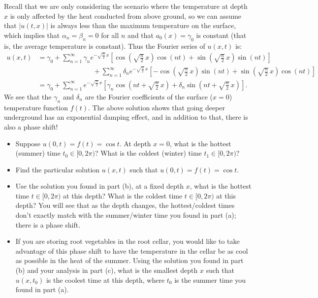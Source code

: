 \documentclass[11pt]{article}
\theoremstyle{definition}
\begin{document}
\begin{enumerate}[leftmargin=*]
Recall that we are only considering the scenario where the temperature at depth $x$ is only affected by the heat conducted from above ground, so we can assume that $|u(t,x)|$ is always less than the maximum temperature on the surface, which implies that $\alpha_{n}=\beta_{n}=0$ for all $n$ and that $a_{0}(x)=\gamma_{0}$ is constant (that is, the average temperature is constant). Thus the Fourier series of $u(x,t)$ is:
\begin{align*}
	u(x,t)
	&=\gamma_{0}+\sum_{n=1}^{\infty}\gamma_{n}e^{-\sqrt{\frac{n}{2}}\,x}\left[\cos(\sqrt{\tfrac{n}{2}}\,x)\cos(nt)+\sin(\sqrt{\tfrac{n}{2}}\,x)\sin(nt)\right]\\
	&\qquad\qquad\qquad\qquad+\sum_{n=1}^{\infty}\delta_{n}e^{-\sqrt{\frac{n}{2}}\,x}\left[-\cos(\sqrt{\tfrac{n}{2}}\,x)\sin(nt)+\sin(\sqrt{\tfrac{n}{2}}\,x)\cos(nt)\right]\\
	&=\gamma_{0}+\sum_{n=1}^{\infty}e^{-\sqrt{\frac{n}{2}}\,x}\left[\gamma_{n}\cos\left(nt+\sqrt{\tfrac{n}{2}}\,x\right)+\delta_{n}\sin\left(nt+\sqrt{\tfrac{n}{2}}\,x\right)\right].
\end{align*}
We see that the $\gamma_{n}$ and $\delta_{n}$ are the Fourier coefficients of the surface ($x=0$) temperature function $f(t)$.  The above solution shows that going deeper underground has an exponential damping effect, and in addition to that, there is also a phase shift!

\begin{itemize}
\item [(a)] Suppose $u(0,t)=f(t)=\cos t$.  At depth $x=0$, what is the hottest (summer) time  $t_0 \in [0,2\pi)$? What is the coldest (winter) time $t_1 \in [0, 2\pi)$?
\item [(b)]  Find the particular solution $u(x,t)$ such that $u(0,t)=f(t)=\cos t$.  
\item [(c)]  Use the solution you found in part (b), at a fixed depth $x$, what is the hottest time $t\in [0, 2\pi)$ at this depth?  What is the coldest time $t\in [0, 2\pi)$ at this depth?  You will see that as the depth changes, the hottest/coldest times don't exactly match with the summer/winter time you found in part (a); there is a phase shift. 
\item [(d)]  If you are storing root vegetables in the root cellar, you would like to take advantage of this phase shift to have the temperature in the cellar be as cool as possible in the heat of the summer.  Using the solution you found in part (b) and your analysis in part (c), what is the smallest depth $x$ such that $u(x,t_0)$ is the coolest time at this depth, where $t_0$ is the summer time you found in part (a).  
\end{itemize}

\end{enumerate}
\end{document}
